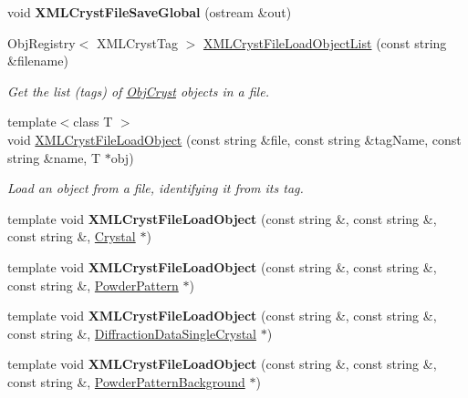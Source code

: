 \begin{DoxyCompactItemize}
void {\bfseries X\+M\+L\+Cryst\+File\+Save\+Global} (ostream \&out)
\item 
Obj\+Registry$<$ X\+M\+L\+Cryst\+Tag $>$ \mbox{\hyperlink{namespace_obj_cryst_af28857ea82236b49644e1210d9b9ebf1}{X\+M\+L\+Cryst\+File\+Load\+Object\+List}} (const string \&filename)
\begin{DoxyCompactList}\small\item\em Get the list (tags) of \mbox{\hyperlink{namespace_obj_cryst}{Obj\+Cryst}} objects in a file. \end{DoxyCompactList}\item 
{\footnotesize template$<$class T $>$ }\\void \mbox{\hyperlink{namespace_obj_cryst_a1f8ac062564ea77ea9c56c7dccb9fdf8}{X\+M\+L\+Cryst\+File\+Load\+Object}} (const string \&file, const string \&tag\+Name, const string \&name, T $\ast$obj)
\begin{DoxyCompactList}\small\item\em Load an object from a file, identifying it from its tag. \end{DoxyCompactList}\item 
\mbox{\label{namespace_obj_cryst_adbdd414c7766c16f4933101c88b3958c}} 
template void {\bfseries X\+M\+L\+Cryst\+File\+Load\+Object} (const string \&, const string \&, const string \&, \mbox{\hyperlink{class_obj_cryst_1_1_crystal}{Crystal}} $\ast$)
\item 
\mbox{\label{namespace_obj_cryst_ae71536c473ca4db79ecb466919331e3b}} 
template void {\bfseries X\+M\+L\+Cryst\+File\+Load\+Object} (const string \&, const string \&, const string \&, \mbox{\hyperlink{class_obj_cryst_1_1_powder_pattern}{Powder\+Pattern}} $\ast$)
\item 
\mbox{\label{namespace_obj_cryst_ab84b3bc431cb20f2690219944b759e65}} 
template void {\bfseries X\+M\+L\+Cryst\+File\+Load\+Object} (const string \&, const string \&, const string \&, \mbox{\hyperlink{class_obj_cryst_1_1_diffraction_data_single_crystal}{Diffraction\+Data\+Single\+Crystal}} $\ast$)
\item 
\mbox{\label{namespace_obj_cryst_a4dd0d2df85db3754db9a64e960e4469b}} 
template void {\bfseries X\+M\+L\+Cryst\+File\+Load\+Object} (const string \&, const string \&, const string \&, \mbox{\hyperlink{class_obj_cryst_1_1_powder_pattern_background}{Powder\+Pattern\+Background}} $\ast$)

\end{DoxyCompactItemize}
